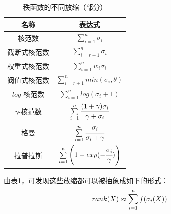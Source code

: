 \documentclass[12pt, a4paper]{article}
\begin{document}
\begin{table}[H]
\centering
\caption{秩函数的不同放缩（部分）}
\label{relaxation}
		
\begin{tabular}{c c}
\toprule
名称&表达式\\
\toprule
核范数&$\sum\limits_{i=1}^{n}\sigma_i$\\
\hline
截断式核范数&$\sum\limits_{i=r+1}^{n}\sigma_i$\\
\hline
权重式核范数&$\sum\limits_{i=1}^{n}w_i\sigma_i$\\
\hline
阀值式核范数&$\sum\limits_{i=r+1}^{n}min(\sigma_i, \theta)$\\
\hline
$log$-核范数&$\sum\limits_{i=1}^{n}log(\sigma_i+1)$\\
\hline
$\gamma$-核范数&$\sum\limits_{i=1}^{n}\cfrac{(1+\gamma)\sigma_i}{\gamma+\sigma_i}$\\
\hline
格曼&$\sum\limits_{i=1}^{n}\cfrac{\sigma_i}{\sigma_i + \gamma}$\\
\hline
拉普拉斯&$\sum\limits_{i=1}^{n}\left(1-exp(-\cfrac{\sigma_i}{\gamma})\right)$\\
\bottomrule
\end{tabular}
\end{table}
\par 由表\ref{relaxation}，可发现这些放缩都可以被抽象成如下的形式：
\begin{displaymath}
\centering
rank(X) \approx \sum\limits_{i=1}^{n}f(\sigma_i(X))
\end{displaymath}
\newpage
\end{document}
